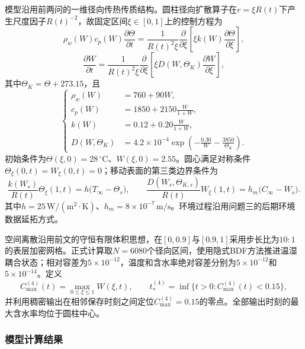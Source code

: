 \documentclass[withoutpreface,bwprint]{cumcmthesis}
\begin{document}
模型沿用前两问的一维径向传热传质结构。圆柱径向扩散算子在$r=\xi R(t)$下产生尺度因子$R(t)^{-2}$，故固定区间$\xi\in[0,1]$上的控制方程为
\begin{equation}
\boxed{
\rho_w(W)c_p(W)\frac{\partial\Theta}{\partial t}
=\frac{1}{R(t)^2\xi}
\frac{\partial}{\partial\xi}
\left[\xi k(W)\frac{\partial\Theta}{\partial\xi}\right],
}
\label{eq:q4-main-heat}
\end{equation}
\begin{equation}
\boxed{
\frac{\partial W}{\partial t}
=\frac{1}{R(t)^2\xi}
\frac{\partial}{\partial\xi}
\left[\xi D(W,\Theta_K)\frac{\partial W}{\partial\xi}\right],
}
\label{eq:q4-main-moisture}
\end{equation}
其中$\Theta_K=\Theta+273.15$，且
\begin{equation}
\left\{
\begin{aligned}
\rho_w(W)&=760+90W,\\
c_p(W)&=1850+2150\frac{W}{1+W},\\
k(W)&=0.12+0.20\frac{W}{1+W},\\
D(W,\Theta_K)&=4.2\times10^{-4}
\exp\!\left(-\frac{0.30}{W}-\frac{3850}{\Theta_K}\right).
\end{aligned}
\right.
\label{eq:q4-main-properties}
\end{equation}
初始条件为$\Theta(\xi,0)=28\,{}^\circ\mathrm C$、$W(\xi,0)=2.55$。圆心满足对称条件$\Theta_\xi(0,t)=W_\xi(0,t)=0$；移动表面的第三类边界条件为
\begin{equation}
\frac{k(W_s)}{R(t)}\Theta_\xi(1,t)
=h\bigl(T_\infty-\Theta_s\bigr),
\qquad
\frac{D(W_s,\Theta_{K,s})}{R(t)}W_\xi(1,t)
=h_m\bigl(C_\infty-W_s\bigr).
\label{eq:q4-main-boundary}
\end{equation}
其中$h=25\,\mathrm{W/(m^2\cdot K)}$、$h_m=8\times10^{-7}\,\mathrm{m/s}$。环境过程沿用问题三的后期环境数据延拓方式。

空间离散沿用前文的守恒有限体积思想，在$[0,0.9]$与$[0.9,1]$采用步长比为$10:1$的表层加密网格。正式计算取$N=6080$个径向区间，使用隐式BDF方法\cite{hairer1996}推进温湿耦合状态；相对容差为$5\times10^{-12}$，温度和含水率绝对容差分别为$5\times10^{-12}$和$5\times10^{-14}$。定义
\begin{equation}
C_{\max}^{(4)}(t)=\max_{0\le\xi\le1}W(\xi,t),
\qquad
t_*^{(4)}=\inf\{t>0:C_{\max}^{(4)}(t)<0.15\},
\label{eq:q4-main-event}
\end{equation}
并利用稠密输出在相邻保存时刻之间定位$C_{\max}^{(4)}=0.15$的零点。全部输出时刻的最大含水率均位于圆柱中心。

\subsubsection{模型计算结果}
\end{document}
